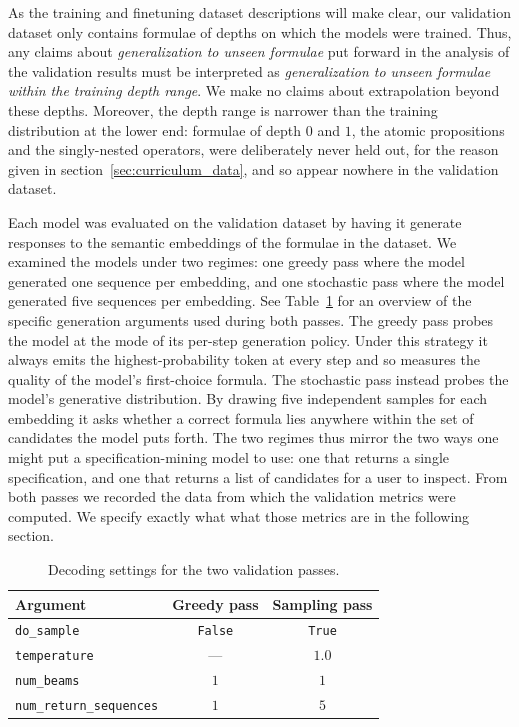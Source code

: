 \documentclass[titlepage,a4paper,11pt]{report}
\begin{document}
    As the training and finetuning dataset descriptions will make clear, our validation dataset only contains formulae of depths on which the models were trained. Thus, any claims about \emph{generalization to unseen formulae} put forward in the analysis of the validation results must be interpreted as \emph{generalization to unseen formulae within the training depth range}. We make no claims about extrapolation beyond these depths. Moreover, the depth range is narrower than the training distribution at the lower end: formulae of depth $0$ and $1$, the atomic propositions and the singly-nested operators, were deliberately never held out, for the reason given in section~\ref{sec:curriculum_data}, and so appear nowhere in the validation dataset.
    
    Each model was evaluated on the validation dataset by having it generate responses to the semantic embeddings of the formulae in the dataset. We examined the models under two regimes: one greedy pass where the model generated one sequence per embedding, and one stochastic pass where the model generated five sequences per embedding. See Table~\ref{tab:validation_generation_settings} for an overview of the specific generation arguments used during both passes. The greedy pass probes the model at the mode of its per-step generation policy. Under this strategy it always emits the highest-probability token at every step and so measures the quality of the model's first-choice formula. The stochastic pass instead probes the model's generative distribution. By drawing five independent samples for each embedding it asks whether a correct formula lies anywhere within the set of candidates the model puts forth. The two regimes thus mirror the two ways one might put a specification-mining model to use: one that returns a single specification, and one that returns a list of candidates for a user to inspect. From both passes we recorded the data from which the validation metrics were computed. We specify exactly what what those metrics are in the following section. 
    
    \begin{table}[h]
        \centering
        \caption{Decoding settings for the two validation passes.}
        \label{tab:validation_generation_settings}
        \begin{tabular}{lcc}
            \toprule
            Argument & Greedy pass & Sampling pass \\
            \midrule
            \texttt{do\_sample}             & \texttt{False}    & \texttt{True} \\
            \texttt{temperature}            & ---               & $1.0$ \\
            \texttt{num\_beams}             & $1$               & $1$ \\
            \texttt{num\_return\_sequences} & $1$               & $5$ \\
            \bottomrule
        \end{tabular}
    \end{table}
    
\end{document}

